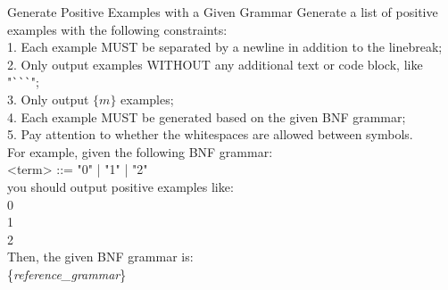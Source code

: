 \begin{promptblock}{Generate Positive Examples with a Given Grammar}
\label{prompt:dc_generate_pexamples}
Generate a list of positive examples with the following constraints:\\
1. Each example MUST be separated by a newline in addition to the linebreak;\\
2. Only output examples WITHOUT any additional text or code block, like "\verb|```|";\\
3. Only output $\{m\}$ examples;\\
4. Each example MUST be generated based on the given BNF grammar;\\
5. Pay attention to whether the whitespaces are allowed between symbols.\\

For example, given the following BNF grammar:\\
<term> ::=  "0" | "1" | "2"\\
you should output positive examples like:\\
0\\
\vspace{\baselineskip}
1\\
\vspace{\baselineskip}
2\\
\vspace{\baselineskip}
Then, the given BNF grammar is:\\
\{\textit{reference\_grammar}\}
\end{promptblock}
\vspace{3.5em}


